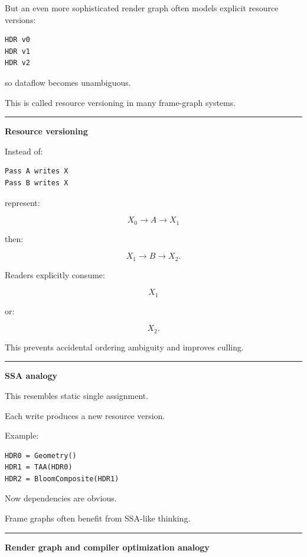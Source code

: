 But an even more sophisticated render graph often models explicit resource versions:

\begin{verbatim}
HDR v0
HDR v1
HDR v2
\end{verbatim}

so dataflow becomes unambiguous.

This is called resource versioning in many frame-graph systems.

\begin{center}\rule{0.5\linewidth}{0.5pt}\end{center}

\textbf{Resource versioning}

Instead of:

\begin{verbatim}
Pass A writes X
Pass B writes X
\end{verbatim}

represent:

\[
X_0
\rightarrow
A
\rightarrow
X_1
\]

then:

\[
X_1
\rightarrow
B
\rightarrow
X_2.
\]

Readers explicitly consume:

\[
X_1
\]

or:

\[
X_2.
\]

This prevents accidental ordering ambiguity and improves culling.

\begin{center}\rule{0.5\linewidth}{0.5pt}\end{center}

\textbf{SSA analogy}

This resembles static single assignment.

Each write produces a new resource version.

Example:

\begin{verbatim}
HDR0 = Geometry()
HDR1 = TAA(HDR0)
HDR2 = BloomComposite(HDR1)
\end{verbatim}

Now dependencies are obvious.

Frame graphs often benefit from SSA-like thinking.

\begin{center}\rule{0.5\linewidth}{0.5pt}\end{center}

\textbf{Render graph and compiler optimization analogy}

